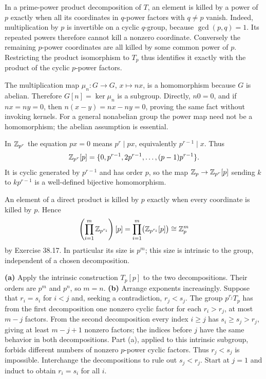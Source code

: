 In a prime-power product decomposition of $T$, an element is killed by a power of $p$ exactly when all its coordinates in $q$-power factors with $q\ne p$ vanish. Indeed, multiplication by $p$ is invertible on a cyclic $q$-group, because $\gcd(p,q)=1$. Its repeated powers therefore cannot kill a nonzero coordinate.
Conversely the remaining $p$-power coordinates are all killed by some common power of $p$. Restricting the product isomorphism to $T_p$ thus identifies it exactly with the product of the cyclic $p$-power factors.

The multiplication map $\mu_n:G\to G$, $x\mapsto nx$, is a homomorphism because $G$ is abelian. Therefore $G[n]=\ker\mu_n$ is a subgroup.
Directly, $n0=0$, and if $nx=ny=0$, then $n(x-y)=nx-ny=0$, proving the same fact without invoking kernels. For a general nonabelian group the power map need not be a homomorphism; the abelian assumption is essential.

In $\mathbb{Z}_{p^r}$ the equation $px=0$ means $p^r\mid px$, equivalently $p^{r-1}\mid x$. Thus
\[
\mathbb{Z}_{p^r}[p]=\{0,p^{r-1},2p^{r-1},\ldots,(p-1)p^{r-1}\}.
\]
It is cyclic generated by $p^{r-1}$ and has order $p$, so the map $\mathbb{Z}_p\to\mathbb{Z}_{p^r}[p]$ sending $k$ to $kp^{r-1}$ is a well-defined bijective homomorphism.

An element of a direct product is killed by $p$ exactly when every coordinate is killed by $p$. Hence
\[
\left(\prod_{i=1}^m\mathbb{Z}_{p^{r_i}}\right)[p]
=\prod_{i=1}^m\bigl(\mathbb{Z}_{p^{r_i}}[p]\bigr)
\cong\mathbb{Z}_p^m
\]
by Exercise 38.17. In particular its size is $p^m$; this size is intrinsic to the group, independent of a chosen decomposition.

\textbf{(a)} Apply the intrinsic construction $T_p[p]$ to the two decompositions. Their orders are $p^m$ and $p^n$, so $m=n$.
\textbf{(b)} Arrange exponents increasingly. Suppose that $r_i=s_i$ for $i<j$ and, seeking a contradiction, $r_j<s_j$. The group $p^{r_j}T_p$ has from the first decomposition one nonzero cyclic factor for each $r_i>r_j$, at most $m-j$ factors. From the second decomposition every index $i\ge j$ has $s_i\ge s_j>r_j$, giving at least $m-j+1$ nonzero factors; the indices before $j$ have the same behavior in both decompositions.
Part (a), applied to this intrinsic subgroup, forbids different numbers of nonzero $p$-power cyclic factors. Thus $r_j<s_j$ is impossible. Interchange the decompositions to rule out $s_j<r_j$. Start at $j=1$ and induct to obtain $r_i=s_i$ for all $i$.

